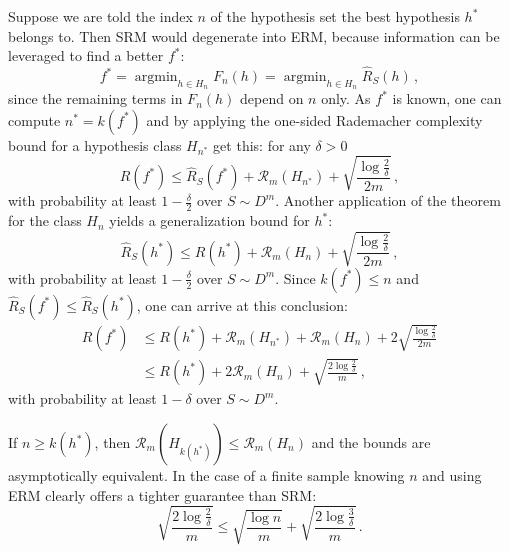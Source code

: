 \documentclass[a4paper]{article}
\newcommand{\argmin}{\mathop{\text{argmin}}}
\begin{document}
Suppose we are told the index $n$ of the hypothesis set the best hypothesis $h^*$
belongs to. Then SRM would degenerate into ERM, because information can be leveraged
to find a better $f^*$:
\[ f^* = \argmin_{h\in H_n} F_n(h) = \argmin_{h\in H_n} \hat{R}_S(h) \,,\]
since the remaining terms in $F_n(h)$ depend on $n$ only. As $f^*$ is known, one
can compute $n^* = k(f^*)$ and by applying the one-sided Rademacher complexity
bound for a hypothesis class $H_{n^*}$ get this: for any $\delta>0$
\[ R(f^*) \leq \hat{R}_S(f^*) + \mathcal{R}_m(H_{n^*})
          + \sqrt{\frac{\log\frac{2}{\delta}}{2m}}
  \,, \]
with probability at least $1-\frac{\delta}{2}$ over $S\sim D^m$. Another application
of the theorem for the class $H_n$ yields a generalization bound for $h^*$:
\[ \hat{R}_S(h^*) \leq R(h^*) + \mathcal{R}_m(H_n)
                  + \sqrt{\frac{\log\frac{2}{\delta}}{2m}}
  \,, \]
with probability at least $1-\frac{\delta}{2}$ over $S\sim D^m$. Since $k(f^*) \leq n$
and $\hat{R}_S(f^*) \leq \hat{R}_S(h^*)$, one can arrive at this conclusion:
\begin{align*}
  R(f^*)
    &\leq R(h^*) + \mathcal{R}_m(H_{n^*}) + \mathcal{R}_m(H_n)
     + 2 \sqrt{\frac{\log\frac{2}{\delta}}{2m}} \\
    &\leq R(h^*) + 2\mathcal{R}_m(H_n)
     + \sqrt{\frac{2\log\frac{2}{\delta}}{m}} \,,
\end{align*}
with probability at least $1-\delta$ over $S\sim D^m$. 

\noindent If $n \geq k(h^*)$, then $\mathcal{R}_m(H_{k(h^*)}) \leq \mathcal{R}_m(H_n)$
and the bounds are asymptotically equivalent. In the case of a finite sample knowing
$n$ and using ERM clearly offers a tighter guarantee than SRM:
\[ \sqrt{\frac{2\log\frac{2}{\delta}}{m}}
    \leq \sqrt{\frac{\log n}{m}}
      + \sqrt{\frac{2\log\frac{3}{\delta}}{m}}
  \,. \]



\end{document}
